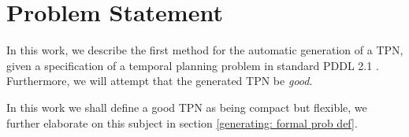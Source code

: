 \section{Problem Statement}
\label{intro: Problem Statement}

In this work, we describe the first method for the automatic generation of a TPN, given a specification of a temporal planning problem in standard PDDL 2.1 \cite{fox2003pddl2}. 
Furthermore, we will attempt that the generated TPN be \emph{good}.

In this work we shall define a good TPN as being compact but flexible, we further elaborate on this subject in section \ref{generating: formal prob def}.


